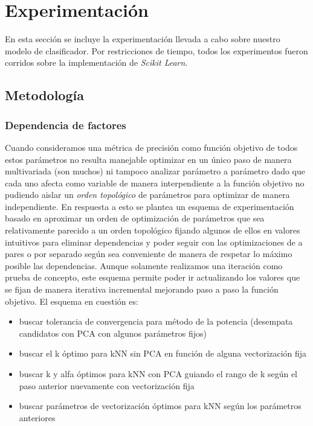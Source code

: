 \section{Experimentación}%
\label{sec:experimentacion}

En esta sección se incluye la experimentación llevada a cabo sobre nuestro
modelo de clasificador.
%
Por restricciones de tiempo, todos los experimentos fueron corridos sobre la
implementación de \textit{Scikit Learn}.

\subsection{Metodología}%
\label{sub:metodologia}
\subsubsection{Dependencia de factores}

Cuando consideramos una métrica de precisión como función objetivo de todos estos parámetros
no resulta manejable optimizar en un único paso de manera multivariada (son muchos)
ni tampoco analizar parámetro a parámetro dado que cada uno afecta como variable de manera
interpendiente a la función objetivo no pudiendo aislar un \textit{orden topológico}
de parámetros para optimizar de manera independiente.
En respuesta a esto se plantea un esquema de experimentación basado en aproximar
un orden de optimización de parámetros que sea relativamente parecido a un orden
topológico fijando algunos de ellos en valores intuitivos para eliminar dependencias
y poder seguir con las optimizaciones de a pares o por separado según sea conveniente
de manera de respetar lo máximo posible las dependencias.
Aunque solamente realizamos una iteración como prueba de concepto, este esquema
permite poder ir actualizando los valores que se fijan de manera iterativa incremental
mejorando paso a paso la función objetivo. El esquema en cuestión es:
\begin{itemize}
    \item buscar tolerancia de convergencia para método de la potencia (desempata candidatos con PCA con algunos parámetros fijos)
    \item buscar el k óptimo para kNN sin PCA en función de alguna vectorización fija
    \item buscar k y alfa óptimos para kNN con  PCA guiando el rango de k según el paso anterior nuevamente con vectorización fija
    \item buscar parámetros de vectorización óptimos para kNN según los parámetros anteriores
\end{itemize}


